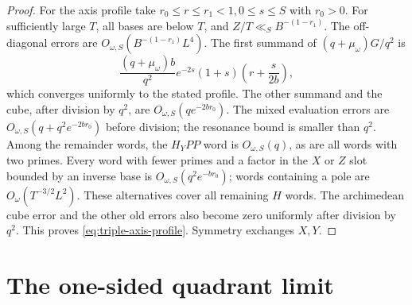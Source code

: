 \documentclass[11pt]{article}
\begin{document}
\begin{proof}
For the axis profile take \(r_0\leq r\leq r_1<1,0\leq s\leq S\)
with \(r_0>0\). For sufficiently large \(T\), all bases are below
\(T\), and \(Z/T\ll_S B^{-(1-r_1)}\). The off-diagonal errors
are \(O_{\omega,S}(B^{-(1-r_1)}L^4)\). The first summand of
\((q+\mu_\omega)G/q^2\) is
\[
 \frac{(q+\mu_\omega)b}{q^2}
 e^{-2s}(1+s)\left(r+\frac{s}{2b}\right),
\]
which converges uniformly to the stated profile. The other summand
and the cube, after division by \(q^2\), are
\(O_{\omega,S}(q e^{-2br_0})\). The mixed evaluation errors are
\(O_{\omega,S}(q+q^2e^{-2br_0})\) before division; the resonance
bound is smaller than \(q^2\). Among the remainder words, the
\(H_YPP\) word is \(O_{\omega,S}(q)\), as are all words with
two primes. Every word with fewer primes and a factor in the \(X\)
or \(Z\) slot bounded by an inverse base is
\(O_{\omega,S}(q^2e^{-br_0})\); words containing a pole are
\(O_\omega(T^{-3/2}L^2)\). These alternatives cover all remaining
\(H\) words. The archimedean cube error and the other old errors
also become zero uniformly after division by \(q^2\).
This proves \eqref{eq:triple-axis-profile}. Symmetry exchanges \(X,Y\).
\end{proof}

\section{The one-sided quadrant limit}
\end{document}
